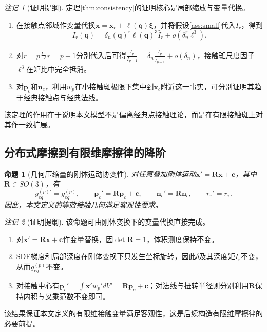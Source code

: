 ﻿\documentclass[12pt, a4paper]{ctexart}
\theoremstyle{plain}
\newtheorem{proposition}{命题}
\theoremstyle{remark}
\newtheorem{remark}{注记}
\begin{document}
\begin{remark}[证明提纲]
定理\ref{thm:consistency}的证明核心是局部缩放与变量代换。
\begin{enumerate}
    \item 在接触点邻域作变量代换$\bm{x} = \bm{x}_c + \ell(\bm{q}) \bm{\xi}$，并将假设\ref{ass:small}代入$I_r$，得到
    \begin{equation}
        I_r(\bm{q}) = \delta_n(\bm{q})^r \ell(\bm{q})^3 \hat{I}_r + o\!\left(\delta_n^r \ell^3\right).
    \end{equation}
    \item 对$r = p$与$r = p-1$分别代入后可得$\frac{I_p}{I_{p-1}} = \delta_n \frac{\hat{I}_p}{\hat{I}_{p-1}} + o(\delta_n)$，接触斑尺度因子$\ell^3$在矩比中完全抵消。
    \item 对$\bm{p}_c$和$\bm{n}_c$，利用$w_p$在小接触斑极限下集中到$\bm{x}_c$附近这一事实，可分别证明其趋于经典接触点与经典法线。
\end{enumerate}
该定理的作用在于说明本文模型不是偏离经典点接触理论，而是在有限接触斑上对其作一致扩展。
\end{remark}

\subsection{分布式摩擦到有限维摩擦律的降阶}
\begin{proposition}[几何压缩量的刚体运动协变性]\label{prop:rigid}
对任意叠加刚体运动$\bm{x}' = \bm{R} \bm{x} + \bm{c}$，其中$\bm{R} \in SO(3)$，有
\begin{equation}
    g_{eq}^{(p)\prime} = g_{eq}^{(p)}, \qquad
    \bm{p}_c' = \bm{R} \bm{p}_c + \bm{c}, \qquad
    \bm{n}_c' = \bm{R} \bm{n}_c, \qquad
    r_{\tau}' = r_{\tau}.
\end{equation}
因此，本文定义的等效接触几何满足客观性要求。
\end{proposition}

\begin{remark}[证明提纲]
该命题可由刚体变换下的变量代换直接完成。
\begin{enumerate}
    \item 对$\bm{x}' = \bm{R}\bm{x} + \bm{c}$作变量替换，因$\det \bm{R} = 1$，体积测度保持不变。
    \item SDF梯度和局部深度在刚体变换下只发生坐标旋转，因此$\delta$及其深度矩$I_r$不变，从而$g_{eq}^{(p)}$不变。
    \item 对接触中心有$\bm{p}_c' = \int \bm{x}' w_p' dV' = \bm{R}\bm{p}_c + \bm{c}$；对法线与扭转半径则分别利用$\bm{R}$保持内积与叉乘范数不变即可。
\end{enumerate}
该结果保证本文定义的有限维接触变量满足客观性，这是后续构造有限维摩擦律的必要前提。
\end{remark}
\end{document}
